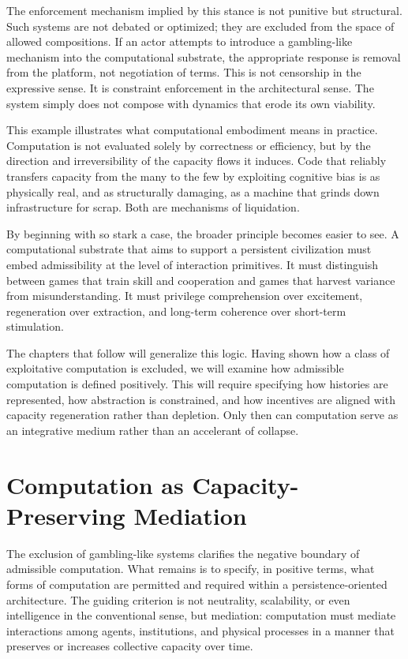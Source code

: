 \documentclass[12pt,oneside]{book}
\begin{document}
The enforcement mechanism implied by this stance is not punitive but structural. Such systems are not debated or optimized; they are excluded from the space of allowed compositions. If an actor attempts to introduce a gambling-like mechanism into the computational substrate, the appropriate response is removal from the platform, not negotiation of terms. This is not censorship in the expressive sense. It is constraint enforcement in the architectural sense. The system simply does not compose with dynamics that erode its own viability.

This example illustrates what computational embodiment means in practice. Computation is not evaluated solely by correctness or efficiency, but by the direction and irreversibility of the capacity flows it induces. Code that reliably transfers capacity from the many to the few by exploiting cognitive bias is as physically real, and as structurally damaging, as a machine that grinds down infrastructure for scrap. Both are mechanisms of liquidation.

By beginning with so stark a case, the broader principle becomes easier to see. A computational substrate that aims to support a persistent civilization must embed admissibility at the level of interaction primitives. It must distinguish between games that train skill and cooperation and games that harvest variance from misunderstanding. It must privilege comprehension over excitement, regeneration over extraction, and long-term coherence over short-term stimulation.

The chapters that follow will generalize this logic. Having shown how a class of exploitative computation is excluded, we will examine how admissible computation is defined positively. This will require specifying how histories are represented, how abstraction is constrained, and how incentives are aligned with capacity regeneration rather than depletion. Only then can computation serve as an integrative medium rather than an accelerant of collapse.

\chapter{Computation as Capacity-Preserving Mediation}

The exclusion of gambling-like systems clarifies the negative boundary of admissible computation. What remains is to specify, in positive terms, what forms of computation are permitted and required within a persistence-oriented architecture. The guiding criterion is not neutrality, scalability, or even intelligence in the conventional sense, but mediation: computation must mediate interactions among agents, institutions, and physical processes in a manner that preserves or increases collective capacity over time.
\end{document}
